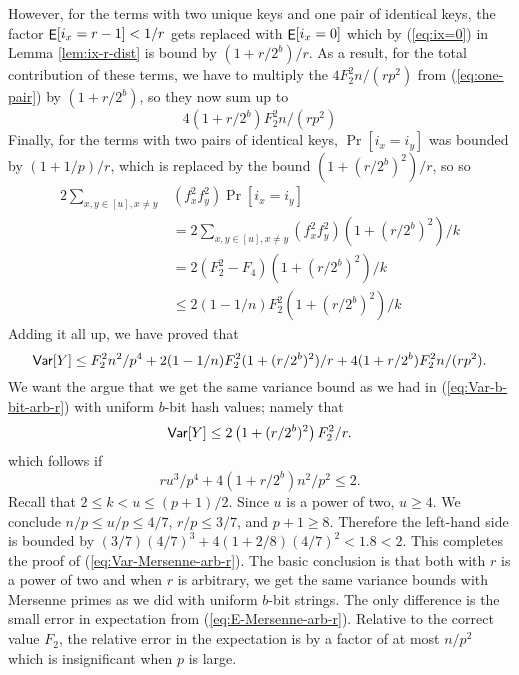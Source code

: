 \documentclass[12pt]{article}
\DeclareMathOperator*{\E}{\sf{E}}
\newcommand{\Var}{{\sf Var}}
\newcommand{\req}[1]{(\ref{#1})}
\begin{document}
However, for the terms with two unique keys and one pair of identical
keys, the factor $\E[i_x=r-1]<1/r$ gets replaced with $\E[i_x=0]$
which by \req{eq:ix=0} in Lemma \ref{lem:ix-r-dist} is bound by
$(1+r/2^b)/r$. As a result, for the total contribution of these terms,
we have to multiply the $4 F_2^2 n/(rp^2)$ from \req{eq:one-pair} by
$(1+r/2^b)$, so they now sum up to
\begin{equation}\label{eq:one-pair'}
4 (1+r/2^b) F_2^2 n/(rp^2)
\end{equation}
Finally, for the terms with two pairs of identical keys, $\Pr[i_x=i_y]$ was bounded
by $(1+1/p)/r$, which is replaced by the bound $\left(1+(r/2^b)^2\right)/r$, so
so 
\begin{align}
2\sum_{x,y\in[u],x\neq y}&(f_x^2f_y^2)\Pr[i_x=i_y]\nonumber\\
&=2\sum_{x,y\in[u],x\neq y}(f_x^2f_y^2)(1+(r/2^b)^2)/k\nonumber\\
&=2(F_2^2-F_4)(1+(r/2^b)^2)/k\nonumber\\
&\leq 2(1-1/n)F_2^2(1+(r/2^b)^2)/k\label{eq:two-pairs'}
\end{align}
Adding it all up, we have proved that 
\[\Var[Y]\leq F_2^2 n^2/p^4+2(1-1/n)F_2^2(1+(r/2^b)^2)/r+4(1+r/2^b)F_2^2 n/(rp^2).\]
We want the argue that we get the same variance bound as we had in 
\req{eq:Var-b-bit-arb-r} with uniform $b$-bit hash values; namely that
\begin{equation}\label{eq:Var-Mersenne-arb-r}
\Var[Y]\leq 2\left(1+(r/2^b)^2\right)F_2^2/r.
\end{equation}
which follows if 
\[ru^3/p^4+4(1+r/2^b)n^2/p^2\leq 2.\]
Recall that $2\leq k<u\leq (p+1)/2$. Since $u$ is a power of two,
$u\geq 4$. We conclude $n/p\leq u/p\leq 4/7$, $r/p\leq 3/7$, and
$p+1\geq 8$. Therefore the left-hand side is bounded by
$(3/7)(4/7)^3+4(1+2/8)(4/7)^2<1.8<2$.  This completes the proof of
\req{eq:Var-Mersenne-arb-r}. The basic conclusion is that both with
$r$ is a power of two and when $r$ is arbitrary, we get the same
variance bounds with Mersenne primes as we did with uniform $b$-bit
strings. The only difference is the small error in expectation from
\req{eq:E-Mersenne-arb-r}. Relative to the correct value $F_2$, the
relative error in the expectation is by a factor of at most
$n/p^2$ which is insignificant when $p$ is large.





\end{document}
